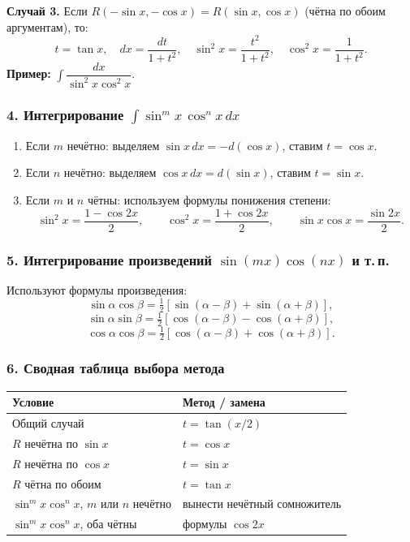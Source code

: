 \textbf{Случай 3.} Если $R(-\sin x, -\cos x) = R(\sin x, \cos x)$ (чётна по обоим аргументам), то:
\[
t = \tan x, \quad dx = \frac{dt}{1+t^2}, \quad
\sin^2 x = \frac{t^2}{1+t^2}, \quad \cos^2 x = \frac{1}{1+t^2}.
\]
\textbf{Пример:} $\int\dfrac{dx}{\sin^2 x \cos^2 x}$.

\subsubsection*{4. Интегрирование $\int \sin^m x\,\cos^n x\,dx$}

\begin{enumerate}
    \item Если $m$ нечётно: выделяем $\sin x\,dx = -d(\cos x)$, ставим $t = \cos x$.
    \item Если $n$ нечётно: выделяем $\cos x\,dx = d(\sin x)$, ставим $t = \sin x$.
    \item Если $m$ и $n$ чётны: используем формулы понижения степени:
    \[
    \sin^2 x = \frac{1-\cos 2x}{2}, \qquad \cos^2 x = \frac{1+\cos 2x}{2},
    \qquad \sin x\cos x = \frac{\sin 2x}{2}.
    \]
\end{enumerate}

\subsubsection*{5. Интегрирование произведений $\sin(mx)\cos(nx)$ и т.\,п.}

Используют формулы произведения:
\[
\sin\alpha\cos\beta = \tfrac{1}{2}[\sin(\alpha-\beta)+\sin(\alpha+\beta)],
\]
\[
\sin\alpha\sin\beta = \tfrac{1}{2}[\cos(\alpha-\beta)-\cos(\alpha+\beta)],
\]
\[
\cos\alpha\cos\beta = \tfrac{1}{2}[\cos(\alpha-\beta)+\cos(\alpha+\beta)].
\]

\subsubsection*{6. Сводная таблица выбора метода}

\begin{center}
\renewcommand{\arraystretch}{1.8}
\begin{tabular}{|l|l|}
\hline
\textbf{Условие} & \textbf{Метод / замена} \\
\hline
Общий случай & $t = \tan(x/2)$ \\
$R$ нечётна по $\sin x$ & $t = \cos x$ \\
$R$ нечётна по $\cos x$ & $t = \sin x$ \\
$R$ чётна по обоим & $t = \tan x$ \\
$\sin^m x\cos^n x$, $m$ или $n$ нечётно & вынести нечётный сомножитель \\
$\sin^m x\cos^n x$, оба чётны & формулы $\cos 2x$ \\
\hline
\end{tabular}
\end{center}